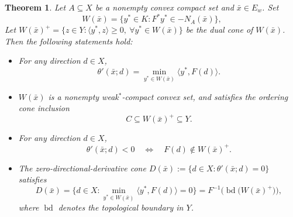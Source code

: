 \documentclass[11pt]{article}
\newtheorem{theorem}{Theorem}[section]
\begin{document}
\begin{theorem}  \label{TTXEQ} 
	Let $A \subseteq X$ be a nonempty convex compact set  and  $\bar x \in E_w$. Set
	\[
	W(\bar{x}) = \bigl\{ y^* \in K : F^* y^* \in -N_A(\bar{x}) \bigr\},
	\]
 	Let $W(\bar{x})^+ = \{z \in Y : \langle y^*, z \rangle \ge 0,\ \forall y^* \in W(\bar{x})\}$ be the dual cone of $W(\bar{x})$.
	Then  the following statements hold:
		\begin{itemize}
			\item[(i)]   For any direction $d \in X$,
		\begin{equation}\label{DZQW+}
		\theta'(\bar{x}; d) = \min_{y^* \in W(\bar{x})} \langle y^*, F(d) \rangle.  
	\end{equation}
		
		\item[(ii)]  $W(\bar{x})$ is a nonempty weak$^*$-compact convex set, and satisfies the ordering cone inclusion
		\[
		C \subseteq W(\bar{x})^+ \subseteq Y.  
		\]
		
\item[(iii)]  For any direction $d \in X$,
		\[
		\theta'(\bar{x}; d) < 0 \quad \Longleftrightarrow \quad F(d) \notin W(\bar{x})^+.   
		\]
	\item[(iv)]  The zero-directional-derivative cone $D(\bar{x}):=\{d\in X:\theta'(\bar{x};d)=0\}$ satisfies
		\[
		D(\bar{x})=\Big\{d\in X:\min_{y^{*}\in W(\bar{x})}\langle y^{*},F(d)\rangle=0\Big\}
		=F^{-1}\Big(\operatorname{bd}\big(W(\bar{x})^{+}\big)\Big),
		\]
		where $\operatorname{bd}$ denotes the topological boundary in $Y$.
\end{itemize}
\end{theorem}
\end{document}
